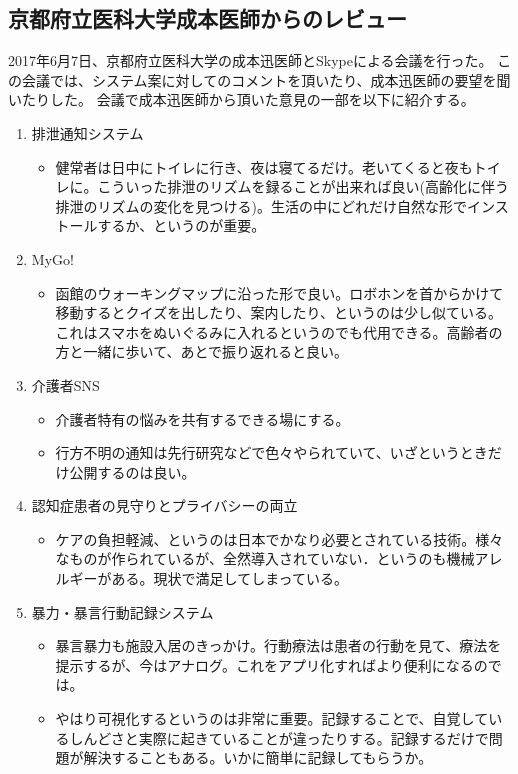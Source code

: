 \documentclass[../report]{subfiles}
\begin{document}
\subsection{京都府立医科大学成本医師からのレビュー}
2017年6月7日、京都府立医科大学の成本迅医師とSkypeによる会議を行った。
この会議では、システム案に対してのコメントを頂いたり、成本迅医師の要望を聞いたりした。
会議で成本迅医師から頂いた意見の一部を以下に紹介する。
\begin{enumerate}
    \item 排泄通知システム
        \begin{itemize}
            \item 健常者は日中にトイレに行き、夜は寝てるだけ。老いてくると夜もトイレに。こういった排泄のリズムを録ることが出来れば良い(高齢化に伴う排泄のリズムの変化を見つける)。生活の中にどれだけ自然な形でインストールするか、というのが重要。
        \end{itemize}
    \item MyGo!
        \begin{itemize}
            \item 函館のウォーキングマップに沿った形で良い。ロボホンを首からかけて移動するとクイズを出したり、案内したり、というのは少し似ている。これはスマホをぬいぐるみに入れるというのでも代用できる。高齢者の方と一緒に歩いて、あとで振り返れると良い。
        \end{itemize}
    \item 介護者SNS
        \begin{itemize}
            \item 介護者特有の悩みを共有するできる場にする。
            \item 行方不明の通知は先行研究などで色々やられていて、いざというときだけ公開するのは良い。
        \end{itemize}
    \item 認知症患者の見守りとプライバシーの両立
        \begin{itemize}
            \item ケアの負担軽減、というのは日本でかなり必要とされている技術。様々なものが作られているが、全然導入されていない．というのも機械アレルギーがある。現状で満足してしまっている。
        \end{itemize}
    \item 暴力・暴言行動記録システム
        \begin{itemize}
            \item 暴言暴力も施設入居のきっかけ。行動療法は患者の行動を見て、療法を提示するが、今はアナログ。これをアプリ化すればより便利になるのでは。
            \item やはり可視化するというのは非常に重要。記録することで、自覚しているしんどさと実際に起きていることが違ったりする。記録するだけで問題が解決することもある。いかに簡単に記録してもらうか。
        \end{itemize}
\end{enumerate}
\end{document}

